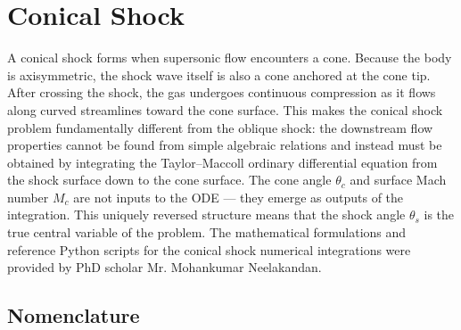 \chapter{Conical Shock}

A conical shock forms when supersonic flow encounters a cone. Because the body is axisymmetric, the shock wave itself is also a cone anchored at the cone tip. After crossing the shock, the gas undergoes continuous compression as it flows along curved streamlines toward the cone surface. This makes the conical shock problem fundamentally different from the oblique shock: the downstream flow properties cannot be found from simple algebraic relations and instead must be obtained by integrating the Taylor--Maccoll ordinary differential equation from the shock surface down to the cone surface. The cone angle $\theta_c$ and surface Mach number $M_c$ are not inputs to the ODE --- they emerge as outputs of the integration. This uniquely reversed structure means that the shock angle $\theta_s$ is the true central variable of the problem. The mathematical formulations and reference Python scripts for the conical shock numerical integrations were provided by PhD scholar Mr. Mohankumar Neelakandan.

\section{Nomenclature}

